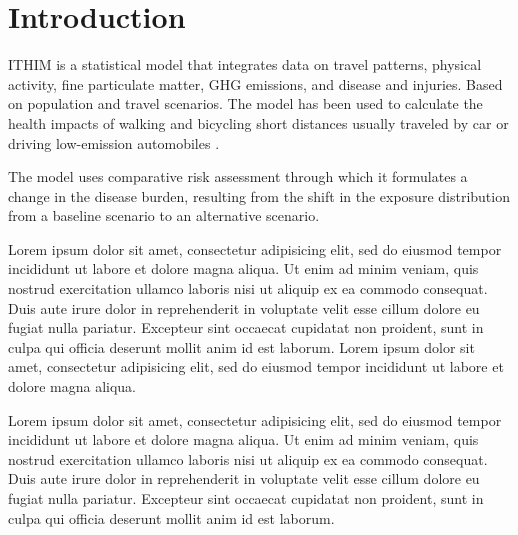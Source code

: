 \documentclass{bioinfo}
\begin{document}
\section{Introduction}
ITHIM is a statistical model that integrates data on travel patterns,
physical activity, fine particulate matter, GHG emissions, and disease
and injuries. Based on population and travel scenarios. The model has
been used to calculate the health impacts of walking and bicycling
short distances usually traveled by car or driving low-emission
automobiles \cite{woodcock2013}.

The model uses comparative risk assessment through which it formulates
a change in the disease burden, resulting from the shift in the
exposure distribution from a baseline scenario to an alternative
scenario.

Lorem ipsum dolor sit amet, consectetur adipisicing elit, sed do
eiusmod tempor incididunt ut labore et dolore magna aliqua. Ut enim ad
minim veniam, quis nostrud exercitation ullamco laboris nisi ut
aliquip ex ea commodo consequat. Duis aute irure dolor in
reprehenderit in voluptate velit esse cillum dolore eu fugiat nulla
pariatur. Excepteur sint occaecat cupidatat non proident, sunt in
culpa qui officia deserunt mollit anim id est laborum. Lorem ipsum
dolor sit amet, consectetur adipisicing elit, sed do eiusmod tempor
incididunt ut labore et dolore magna aliqua.

Lorem ipsum dolor sit amet, consectetur adipisicing elit, sed do
eiusmod tempor incididunt ut labore et dolore magna aliqua. Ut enim ad
minim veniam, quis nostrud exercitation ullamco laboris nisi ut
aliquip ex ea commodo consequat. Duis aute irure dolor in
reprehenderit in voluptate velit esse cillum dolore eu fugiat nulla
pariatur. Excepteur sint occaecat cupidatat non proident, sunt in
culpa qui officia deserunt mollit anim id est laborum.
\end{document}
